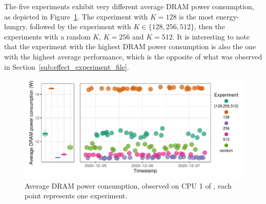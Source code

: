             The five experiments exhibit very different average DRAM power consumption, as depicted in
            Figure~\ref{fig:randomizing_sizes:expfile:fixing_K:power_DRAM}. The experiment with \(K=128\) is the most
            energy-hungry, followed by the experiment with \(K\in\{128,256,512\}\), then the experiments with a random
            \(K\), \(K=256\) and \(K=512\). It is interesting to note that the experiment with the highest DRAM power
            consumption is also the one with the highest average \dgemm performance, which is the opposite of what was
            observed in Section~\ref{sub:effect_experiment_file}.
            \begin{figure}[htpb]
                \centering
                \includegraphics[width=1\linewidth]{img/experiment/randomizing_sizes/fixing_K/average_power_DRAM.pdf}
                \caption{Average DRAM power consumption, observed on CPU 1 of \dahu[5], each point represents one experiment.}%
                \label{fig:randomizing_sizes:expfile:fixing_K:power_DRAM}
            \end{figure}

